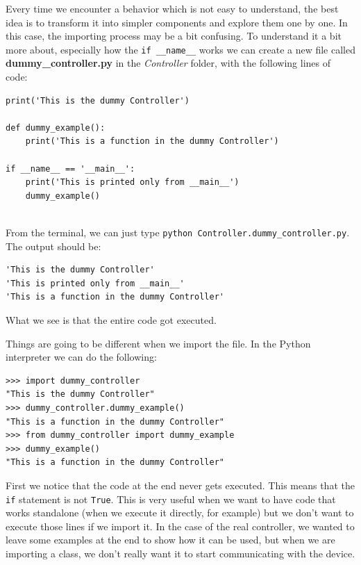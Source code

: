 Every time we encounter a behavior which is not easy to understand, the best idea is to transform it into simpler components and explore them one by one. In this case, the importing process may be a bit confusing. To understand it a bit more about, especially how the \texttt{if __name__} works we can create a new file called \textbf{dummy\_controller.py} in the \emph{Controller} folder, with the following lines of code:

\begin{verbatim}
print('This is the dummy Controller')

def dummy_example():
    print('This is a function in the dummy Controller')

if __name__ == '__main__':
    print('This is printed only from __main__')
    dummy_example()
    
\end{verbatim}

From the terminal, we can just type \texttt{python Controller.dummy\_controller.py}. The output should be:

\begin{verbatim}
'This is the dummy Controller'
'This is printed only from __main__'
'This is a function in the dummy Controller'
\end{verbatim}

What we see is that the entire code got executed.


Things are going to be different when we import the file. In the Python interpreter we can do the following:

\begin{verbatim}
>>> import dummy_controller
"This is the dummy Controller"
>>> dummy_controller.dummy_example()
"This is a function in the dummy Controller"
>>> from dummy_controller import dummy_example
>>> dummy_example()
"This is a function in the dummy Controller"
\end{verbatim}

First we notice that the code at the end never gets executed. This means that the \texttt{if} statement is not \texttt{True}. This is very useful when we want to have code that works standalone (when we execute it directly, for example) but we don't want to execute those lines if we import it. In the case of the real controller, we wanted to leave some examples at the end to show how it can be used, but when we are importing a class, we don't really want it to start communicating with the device. 

